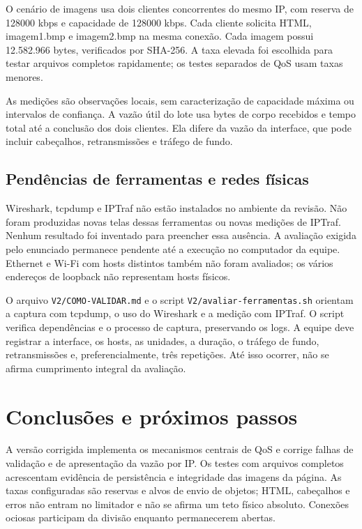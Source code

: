 \documentclass[12pt]{article}
\begin{document}


O cenário de imagens usa dois clientes concorrentes do mesmo IP, com reserva
de 128000 kbps e capacidade de 128000 kbps. Cada cliente solicita HTML,
imagem1.bmp e imagem2.bmp na mesma conexão. Cada imagem possui 12.582.966 bytes,
verificados por SHA-256. A taxa elevada foi escolhida para testar arquivos
completos rapidamente; os testes separados de QoS usam taxas menores.

As medições são observações locais, sem caracterização de capacidade máxima ou
intervalos de confiança. A vazão útil do lote usa bytes de corpo recebidos e
tempo total até a conclusão dos dois clientes. Ela difere da vazão da interface,
que pode incluir cabeçalhos, retransmissões e tráfego de fundo.

\subsection{Pendências de ferramentas e redes físicas}
Wireshark, tcpdump e IPTraf não estão instalados no ambiente da revisão.
Não foram produzidas novas telas dessas ferramentas ou novas medições de
IPTraf. Nenhum resultado foi inventado para preencher essa ausência.
A avaliação exigida pelo enunciado permanece pendente até a execução no
computador da equipe. Ethernet e Wi-Fi com hosts distintos também não foram
avaliados; os vários endereços de loopback não representam hosts físicos.

O arquivo \texttt{V2/COMO-VALIDAR.md} e o script
\texttt{V2/avaliar-ferramentas.sh} orientam a captura com tcpdump, o uso do
Wireshark e a medição com IPTraf. O script verifica dependências e o processo
de captura, preservando os logs. A equipe deve registrar a interface, os hosts,
as unidades, a duração, o tráfego de fundo, retransmissões e, preferencialmente,
três repetições. Até isso ocorrer, não se afirma cumprimento integral da avaliação.

\section{Conclusões e próximos passos}
A versão corrigida implementa os mecanismos centrais de QoS e corrige falhas de
validação e de apresentação da vazão por IP. Os testes com arquivos completos
acrescentam evidência de persistência e integridade das imagens da página.
As taxas configuradas são reservas e alvos de envio de objetos; HTML, cabeçalhos
e erros não entram no limitador e não se afirma um teto físico absoluto.
Conexões ociosas participam da divisão enquanto permanecerem abertas.
\end{document}
